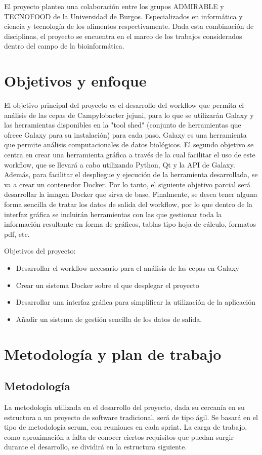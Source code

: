 El proyecto plantea una colaboración entre los grupos ADMIRABLE y TECNOFOOD de la Universidad de Burgos. Especializados en informática y ciencia y tecnología de los alimentos respectivamente. Dada esta combinación de disciplinas, el proyecto se encuentra en el marco de los trabajos considerados dentro del campo de la bioinformática.


\section{Objetivos y enfoque}
El objetivo principal del proyecto es el desarrollo del workflow que permita el análisis de las cepas de Campylobacter jejuni, para lo que se utilizarán Galaxy y las herramientas disponibles en la "tool shed" (conjunto de herramientas que ofrece Galaxy para su instalación) para cada paso. Galaxy es una herramienta que permite análisis computacionales de datos biológicos. 
El segundo objetivo se centra en crear una herramienta gráfica a través de la cual facilitar el uso de este workflow, que se llevará a cabo utilizando Python, Qt y la API de Galaxy. 
Además, para facilitar el despliegue y ejecución de la herramienta desarrollada, se va a crear un contenedor Docker. Por lo tanto, el siguiente objetivo parcial será desarrollar la imagen Docker que sirva de base.
Finalmente, se desea tener alguna forma sencilla de tratar los datos de salida del workflow, por lo que dentro de la interfaz gráfica se incluirán herramientas con las que gestionar toda la información resultante en forma de gráficos, tablas tipo hoja de cálculo, formatos pdf, etc.

Objetivos del proyecto:
\begin{itemize}
\item Desarrollar el workflow necesario para el análisis de las cepas en Galaxy
\item Crear un sistema Docker sobre el que desplegar el proyecto
\item Desarrollar una interfaz gráfica para simplificar la utilización de la aplicación
\item Añadir un sistema de gestión sencilla de los datos de salida.
\end{itemize}


\section{Metodología y plan de trabajo}
\subsection{Metodología}
La metodología utilizada en el desarrollo del proyecto, dada su cercanía en su estructura a un proyecto de software tradicional, será de tipo ágil. Se basará en el tipo de metodología scrum, con reuniones en cada sprint.
La carga de trabajo, como aproximación a falta de conocer ciertos requisitos que puedan surgir durante el desarrollo, se dividirá en la estructura siguiente.

